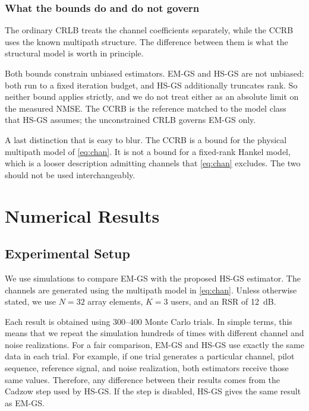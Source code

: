 \documentclass[journal]{IEEEtran}
\begin{document}
\subsubsection{What the bounds do and do not govern}

The ordinary CRLB treats the channel coefficients separately, while the CCRB
uses the known multipath structure. The difference between them is what the
structural model is worth in principle.

Both bounds constrain unbiased estimators. EM-GS and HS-GS are not unbiased:
both run to a fixed iteration budget, and HS-GS additionally truncates rank. So
neither bound applies strictly, and we do not treat either as an absolute limit
on the measured NMSE. The CCRB is the reference matched to the model class that
HS-GS assumes; the unconstrained CRLB governs EM-GS only.

A last distinction that is easy to blur. The CCRB is a bound for the physical
multipath model of \eqref{eq:chan}. It is not a bound for a fixed-rank Hankel
model, which is a looser description admitting channels that \eqref{eq:chan}
excludes. The two should not be used interchangeably.

\section{Numerical Results}
\label{sec:results}

\subsection{Experimental Setup}
\label{sec:setup}

We use simulations to compare EM-GS with the proposed HS-GS estimator. The
channels are generated using the multipath model in \eqref{eq:chan}. Unless
otherwise stated, we use $N=32$ array elements, $K=3$ users, and an RSR of
12~dB.

Each result is obtained using 300--400 Monte Carlo trials. In simple terms,
this means that we repeat the simulation hundreds of times with different
channel and noise realizations. For a fair comparison, EM-GS and HS-GS use
exactly the same data in each trial. For example, if one trial generates a
particular channel, pilot sequence, reference signal, and noise realization,
both estimators receive those same values. Therefore, any difference between
their results comes from the Cadzow step used by HS-GS. If the step is
disabled, HS-GS gives the same result as EM-GS.
\end{document}
